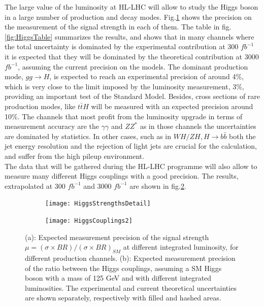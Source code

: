 \documentclass[a4paper,twoside,12pt]{article}
\begin{document}
The large value of the luminosity at HL-LHC will allow to study the Higgs boson in a large number of
production and decay modes. Fig.\ref{fig:HiggsStrengths} shows the precision on the measurement
of the signal strength in each of them. The table in fig.\ref{fig:HiggsTable} summarizes
the results, and shows that in many channels where the total uncertainty is
dominated by the experimental contribution at 300 $fb^{-1}$ it is expected that 
they will be dominated by
the theoretical contribution at 3000 $fb^{-1}$, assuming the current precision on
the models. The dominant production mode, $gg \rightarrow H$, is expected to reach
an experimental precision of around 4\%, which is very close to the limit imposed by the luminosity 
measurement, 3\%, providing an important test of the Standard Model. Besides, cross
sections of rare production modes, like $t\bar{t}H$ will be
measured with an expected precision around 10\%. The channels that most profit from the
luminosity upgrade in terms of measurement accuracy are the $\gamma\gamma$ and $ZZ^*$
as in those channels the uncertainties are dominated by statistics. In other cases, such as in $WH/ZH, H \rightarrow b\bar{b}$ both the jet
energy resolution and the rejection of light jets are crucial for the calculation, and suffer from
the high pileup environment. \\

The data that will be gathered during the HL-LHC programme will also allow to
measure many different Higgs couplings with a good precision. The results, extrapolated
at 300 $fb^{-1}$ and 3000 $fb^{-1}$ are shown in fig.\ref{fig:higgsCouplings}.\\



\begin{figure} [h]
\begin{subfigure}{.5\linewidth}
	\centering
	\texttt{[image: HiggsStrengthsDetail]}
	\caption{}
	\label{fig:HiggsStrengths}
\end{subfigure}
\begin{subfigure}{.5\linewidth}
	\centering
	\texttt{[image: HiggsCouplings2]}
	\caption{}
	\label{fig:higgsCouplings}
\end{subfigure}
\caption{(a): Expected measurement precision of the signal strength $\mu = (\sigma \times BR)/(\sigma \times BR)_{SM}$\cite{loi} at different integrated luminosity, for different
	production channels. (b): Expected measurement precision of the ratio between the
	Higgs couplings, assuming a SM Higgs boson with a mass of 125 GeV and with different integrated luminosities.
	 The experimental and current theoretical uncertainties are shown separately, respectively with filled and hashed areas\cite{higgsNote}.}
\label{fig:higgsMeasurement}
\end{figure}
\end{document}
